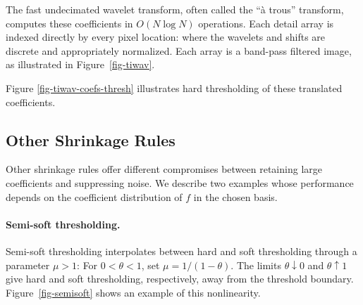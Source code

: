 The fast undecimated wavelet transform, often called the ``\`a trous'' transform, computes these coefficients in $O(N\log N)$ operations. Each detail array is indexed directly by every pixel location:
where the wavelets and shifts are discrete and appropriately normalized. Each array is a band-pass filtered image, as illustrated in Figure~\ref{fig-tiwav}.


Figure \ref{fig-tiwav-coefs-thresh} illustrates hard thresholding of these translated coefficients.




                                                     
\subsection{Other Shrinkage Rules}

Other shrinkage rules offer different compromises between retaining large coefficients and suppressing noise. We describe two examples whose performance depends on the coefficient distribution of $f$ in the chosen basis.

  
\paragraph{Semi-soft thresholding.}

Semi-soft thresholding interpolates between hard and soft thresholding through a parameter $\mu>1$:
For $0<\theta<1$, set $\mu=1/(1-\theta)$. The limits $\theta\downarrow0$ and $\theta\uparrow1$ give hard and soft thresholding, respectively, away from the threshold boundary.
Figure~\ref{fig-semisoft} shows an example of this nonlinearity.

